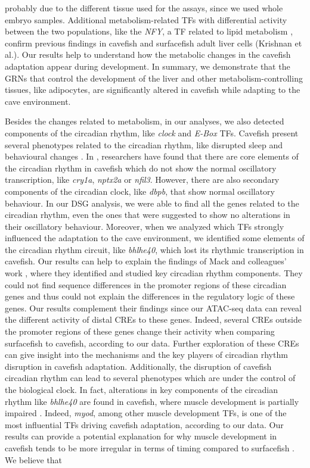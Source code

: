 probably due to the different tissue used for the assays, since we used whole embryo samples. Additional metabolism-related TFs with differential activity between the two populations, like the \textit{NFY}, a TF related to lipid metabolism \parencite{lu_nuclear_2015}, confirm previous findings in cavefish and surfacefish adult liver cells (Krishnan et al.). Our results help to understand how the metabolic changes in the cavefish adaptation appear during development. In summary, we demonstrate that the GRNs that control the development of the liver and other metabolism-controlling tissues, like adipocytes, are significantly altered in cavefish while adapting to the cave environment.


Besides the changes related to metabolism, in our analyses, we also detected components of the circadian rhythm, like \textit{clock} and \textit{E-Box} TFs. Cavefish present several phenotypes related to the circadian rhythm, like disrupted sleep and behavioural changes \parencite{beale_circadian_2013, moran_eyeless_2014, yoshizawa_distinct_2015}. In \parencite{mack_repeated_2021}, researchers have found that there are core elements of the circadian rhythm in cavefish which do not show the normal oscillatory transcription, like \textit{cry1a}, \textit{nptx2a} or \textit{nfil3}. However, there are also secondary components of the circadian clock, like \textit{dbpb}, that show normal oscillatory behaviour. In our DSG analysis, we were able to find all the genes related to the circadian rhythm, even the ones that were suggested to show no alterations in their oscillatory behaviour. Moreover, when we analyzed which TFs strongly influenced the adaptation to the cave environment, we identified some elements of the circadian rhythm circuit, like \textit{bhlhe40}, which lost its rhythmic transcription in cavefish. Our results can help to explain the findings of Mack and colleagues' work \parencite{mack_repeated_2021}, where they identified and studied key circadian rhythm components. They could not find sequence differences in the promoter regions of these circadian genes and thus could not explain the differences in the regulatory logic of these genes. Our results complement their findings since our ATAC-seq data can reveal the different activity of distal CREs to these genes. Indeed, several CREs outside the promoter regions of these genes change their activity when comparing surfacefish to cavefish, according to our data. Further exploration of these CREs can give insight into the mechanisms and the key players of circadian rhythm disruption in cavefish adaptation. Additionally, the disruption of cavefish circadian rhythm can lead to several phenotypes which are under the control of the biological clock. In fact, alterations in key components of the circadian rhythm like \textit{bhlhe40} are found in cavefish, where muscle development is partially impaired \parencite{bian_clock1a_2017}. Indeed, \textit{myod}, among other muscle development TFs, is one of the most influential TFs driving cavefish adaptation, according to our data. Our results can provide a potential explanation for why muscle development in cavefish tends to be more irregular in terms of timing compared to surfacefish \parencite{hinaux_developmental_2011}. We believe that 